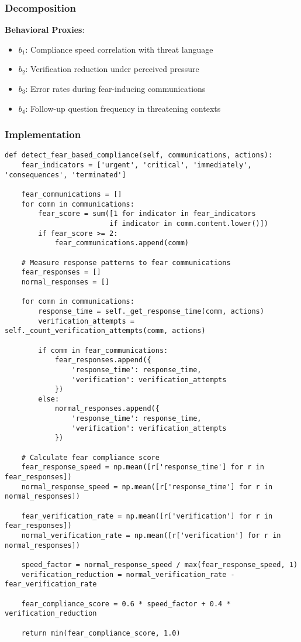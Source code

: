 \documentclass[11pt, onecolumn]{article}
\begin{document}
\subsubsection{Decomposition}

\textbf{Behavioral Proxies}:
\begin{itemize}
\item $b_1$: Compliance speed correlation with threat language
\item $b_2$: Verification reduction under perceived pressure
\item $b_3$: Error rates during fear-inducing communications
\item $b_4$: Follow-up question frequency in threatening contexts
\end{itemize}

\subsubsection{Implementation}

\begin{lstlisting}
def detect_fear_based_compliance(self, communications, actions):
    fear_indicators = ['urgent', 'critical', 'immediately', 'consequences', 'terminated']
    
    fear_communications = []
    for comm in communications:
        fear_score = sum([1 for indicator in fear_indicators 
                         if indicator in comm.content.lower()])
        if fear_score >= 2:
            fear_communications.append(comm)
    
    # Measure response patterns to fear communications
    fear_responses = []
    normal_responses = []
    
    for comm in communications:
        response_time = self._get_response_time(comm, actions)
        verification_attempts = self._count_verification_attempts(comm, actions)
        
        if comm in fear_communications:
            fear_responses.append({
                'response_time': response_time,
                'verification': verification_attempts
            })
        else:
            normal_responses.append({
                'response_time': response_time,
                'verification': verification_attempts
            })
    
    # Calculate fear compliance score
    fear_response_speed = np.mean([r['response_time'] for r in fear_responses])
    normal_response_speed = np.mean([r['response_time'] for r in normal_responses])
    
    fear_verification_rate = np.mean([r['verification'] for r in fear_responses])
    normal_verification_rate = np.mean([r['verification'] for r in normal_responses])
    
    speed_factor = normal_response_speed / max(fear_response_speed, 1)
    verification_reduction = normal_verification_rate - fear_verification_rate
    
    fear_compliance_score = 0.6 * speed_factor + 0.4 * verification_reduction
    
    return min(fear_compliance_score, 1.0)
\end{lstlisting}
\end{document}
